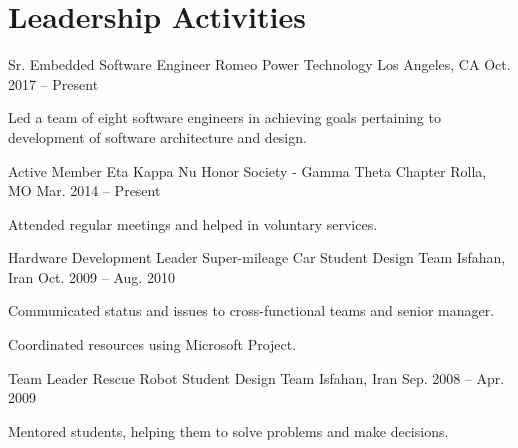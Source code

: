 \section{Leadership Activities}
\begin{cventries}
  \cventry
    {Sr. Embedded Software Engineer}
    {Romeo Power Technology}
    {Los Angeles, CA}
    {Oct. 2017 -- Present}
    {
      \begin{cvitems}
        \item Led a team of eight software engineers in achieving goals pertaining to development of software architecture and design.
      \end{cvitems}
    }
  \cventry
    {Active Member}
    {Eta Kappa Nu Honor Society - Gamma Theta Chapter}
    {Rolla, MO}
    {Mar. 2014 -- Present}
    {
      \begin{cvitems}
        \item Attended regular meetings and helped in voluntary services.
      \end{cvitems}
    }
  \cventry
    {Hardware Development Leader}
    {Super-mileage Car Student Design Team}
    {Isfahan, Iran}
    {Oct. 2009 -- Aug. 2010}
    {
      \begin{cvitems}
        \item Communicated status and issues to cross-functional teams and senior manager.
        \item Coordinated resources using Microsoft Project.
      \end{cvitems}
    }
  \cventry
    {Team Leader}
    {Rescue Robot Student Design Team}
    {Isfahan, Iran}
    {Sep. 2008 -- Apr. 2009}
    {
      \begin{cvitems}
        \item Mentored students, helping them to solve problems and make decisions.
      \end{cvitems}
    }
\end{cventries} 